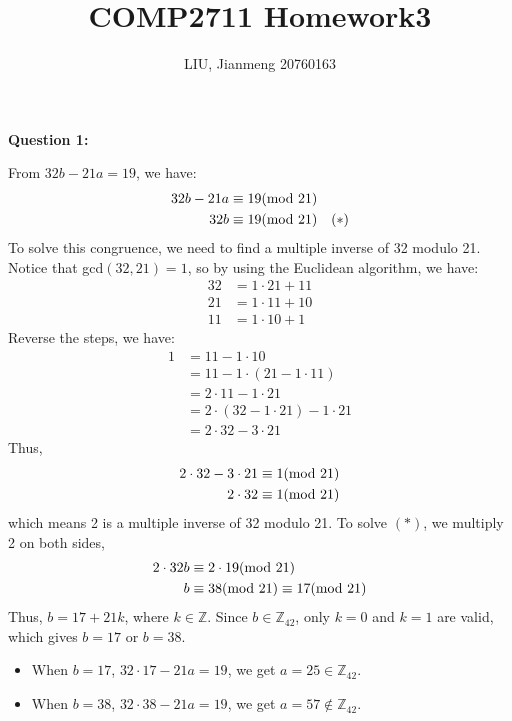 \documentclass[a4paper,11pt]{article}
\title{\textbf{COMP2711} Homework3}
\author{LIU, Jianmeng 20760163}
\date{}
\begin{document}
    \maketitle

    \begin{spacing}{1.4}

    \setlength{\parindent}{0px}

    \textbf{Question 1:}

    From $32b-21a=19$, we have:
    \begin{align*}
        32b-21a&\equiv 19 (\rm mod \ 21)\\
        32b&\equiv 19 (\rm mod \ 21)\ \ \ (*)
    \end{align*}
    To solve this congruence, we need to find a multiple inverse
    of 32 modulo 21. Notice that gcd$(32, 21)=1$, so by
    using the Euclidean algorithm, we have:
    \begin{align*}
        32 &= 1\cdot 21 + 11\\
        21 &= 1\cdot 11 + 10\\
        11 &= 1\cdot 10 + 1
    \end{align*}
    Reverse the steps, we have:
    \begin{align*}
        1&=11-1\cdot 10\\
         &=11-1\cdot (21-1\cdot 11)\\
         &=2\cdot 11-1\cdot 21\\
         &=2\cdot (32-1\cdot 21)-1\cdot 21\\
         &=2\cdot 32-3\cdot 21
    \end{align*}
    Thus,
    \begin{align*}
        2\cdot 32-3\cdot 21 &\equiv 1 ({\rm mod}\ 21)\\
        2\cdot 32 &\equiv 1 ({\rm mod}\ 21)
    \end{align*}
    which means 2 is a multiple inverse of 32 modulo 21.
    To solve $(*)$, we multiply 2 on both sides,
    \begin{align*}
        2\cdot 32b &\equiv 2\cdot 19 ({\rm mod}\ 21)\\
        b &\equiv 38({\rm mod}\ 21) \equiv 17({\rm mod}\ 21)
    \end{align*}
    Thus, $b=17+21k$, where $k\in \mathbb{Z}$. 
    Since $b\in \mathbb{Z}_{42}$, only $k=0$ and $k=1$ are valid,
    which gives $b=17$ or $b=38$.
    \begin{itemize}
        \item When $b=17$, $32\cdot 17-21a=19$, 
        we get $a=25\in \mathbb{Z}_{42}$.
        \item When $b=38$, $32\cdot 38-21a=19$, 
        we get $a=57\notin \mathbb{Z}_{42}$.
    \end{itemize}


\end{spacing}
\end{document}
